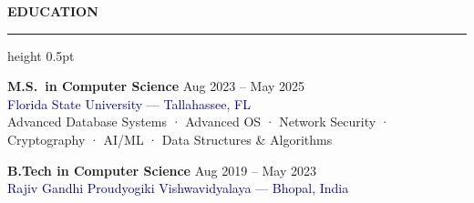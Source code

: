 \documentclass[10pt, letterpaper]{article}
\newcommand{\resumesection}[1]{%
  \vspace{8pt}%
  {\large\bfseries\color{navy} #1}%
  \vspace{2pt}%
  \hrule height 0.5pt \color{navy}%
  \vspace{4pt}%
}
\begin{document}
\resumesection{EDUCATION}

\vspace{2pt}
{\fontsize{9.5pt}{12pt}\selectfont
  \textbf{\color{darktext}M.S.\ in Computer Science}%
  \hfill
  \textcolor{mutedtext}{\fontsize{8.5pt}{11pt}\selectfont Aug 2023 -- May 2025}\\
  \textcolor{navy}{Florida State University --- Tallahassee, FL}\\
  {\fontsize{8.5pt}{11pt}\selectfont\color{mutedtext}
    Advanced Database Systems · Advanced OS · Network Security · Cryptography · AI/ML · Data Structures \& Algorithms
  }
}

\vspace{6pt}
{\fontsize{9.5pt}{12pt}\selectfont
  \textbf{\color{darktext}B.Tech in Computer Science}%
  \hfill
  \textcolor{mutedtext}{\fontsize{8.5pt}{11pt}\selectfont Aug 2019 -- May 2023}\\
  \textcolor{navy}{Rajiv Gandhi Proudyogiki Vishwavidyalaya --- Bhopal, India}
}

\end{document}
